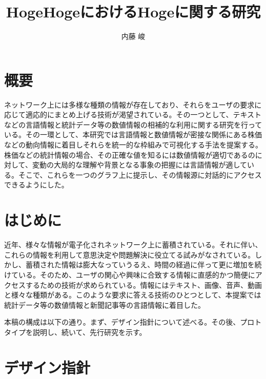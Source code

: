 \documentclass{matsushita-zemi}
\title{HogeHogeにおけるHogeに関する研究}
\author{内藤 峻}
\begin{document}
\maketitle

\section*{概要}
\label{abstract}
ネットワーク上には多様な種類の情報が存在しており、それらをユーザの要求に応じて適応的にまとめ上げる技術が渇望されている。その一つとして、テキストなどの言語情報と統計データ等の数値情報の相補的な利用に関する研究を行っている。その一環として、本研究では言語情報と数値情報が密接な関係にある株価などの動向情報に着目しそれらを統一的な枠組みで可視化する手法を提案する。株価などの統計情報の場合、その正確な値を知るには数値情報が適切であるのに対して、変動の大局的な理解や背景となる事象の把握には言語情報が適している。そこで、これらを一つのグラフ上に提示し、その情報源に対話的にアクセスできるようにした。

\section{はじめに}
\label{background}
近年、様々な情報が電子化されネットワーク上に蓄積されている。それに伴い、これらの情報を利用して意思決定や問題解決に役立てる試みがなされている。しかし、蓄積された情報は膨大なっていうるえ、時間の経過に伴って更に増加を続けている。そのため、ユーザの関心や興味に合致する情報に直感的かつ簡便にアクセスするための技術が求められている\cite{基盤技術}\cite{可視化手法}。情報にはテキスト、画像、音声、動画と様々な種類がある。このような要求に答える技術のひとつとして、本提案では統計データ等の数値情報と新聞記事等の言語情報に着目した。

本稿の構成は以下の通り。まず、デザイン指針について述べる。その後、プロトタイプを説明し、続いて、先行研究を示す。

\section{デザイン指針}
\end{document}
